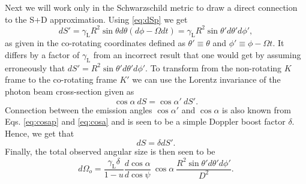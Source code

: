 \documentclass{aa}
\newcommand{\be}{\begin{equation}}
\newcommand{\ee}{\end{equation}}
\newcommand{\refe}[1]{#1}
\newcommand{\refedel}[1]{}
\newcommand{\sch}{Schwarzschild }
\newcommand{\Ob}{\ensuremath{\hat{\Omega}}}
\newcommand{\lgamma}{\gamma_{\text{L}}}
\begin{document}
Next we will work only in the \sch \refe{metric to draw a direct connection to the S+D approximation.} \refedel{and consider only terms up to $\mathcal{O}(\Ob^2)$.}
\refe{Using \eqref{eq:dSp} we get}
\be\label{eq:dS_subs}
dS' = \lgamma R^2 \sin\theta d\theta (d\phi - \Omega dt) = \lgamma R^2 \sin\theta' d\theta' d\phi',
\ee
as given in the co-rotating coordinates defined as $\theta' \equiv \theta$ and $\phi' \equiv \phi - \Omega t$.
\refe{It differs by a factor of $\lgamma$ from an incorrect result that one would get by assuming erroneously that $dS' = R^2 \sin\theta' d\theta' d\phi'$.}
To transform from the non-rotating $K$ frame to the co-rotating frame $K'$ we can use the Lorentz invariance of the photon beam cross-section given as \citep{Terrell60, LB85}
\be
\cos\alpha ~dS = \cos\alpha' ~dS'.
\ee
Connection between the emission angles $\cos\alpha'$ and $\cos\alpha$ is also known from Eqs. \eqref{eq:cosap} and \eqref{eq:cosa} and is seen to be a simple Doppler boost factor $\delta$.
\refe{Hence, we get that}
\be\label{eq:dSisdSp}
dS = \delta dS'.
\ee
Finally, the total observed angular size is then seen to be 
\be
d\Omega_o = \frac{\lgamma \delta}{1-u} \frac{d \cos\alpha}{d \cos\psi} ~\cos\alpha ~ \frac{R^2 \sin\theta' d\theta' d\phi'}{D^2}.
\ee
\end{document}
